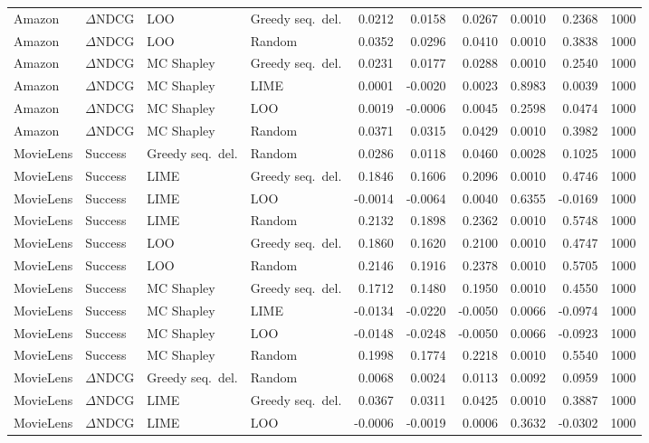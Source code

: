 \begin{longtable}{@{}p{}p{}p{}p{}rrrrrr@{}}
Amazon & $\Delta$NDCG & LOO & Greedy seq.\ del. & 0.0212 & 0.0158 & 0.0267 & 0.0010 & 0.2368 & 1000 \\
Amazon & $\Delta$NDCG & LOO & Random & 0.0352 & 0.0296 & 0.0410 & 0.0010 & 0.3838 & 1000 \\
Amazon & $\Delta$NDCG & MC Shapley & Greedy seq.\ del. & 0.0231 & 0.0177 & 0.0288 & 0.0010 & 0.2540 & 1000 \\
Amazon & $\Delta$NDCG & MC Shapley & LIME & 0.0001 & -0.0020 & 0.0023 & 0.8983 & 0.0039 & 1000 \\
Amazon & $\Delta$NDCG & MC Shapley & LOO & 0.0019 & -0.0006 & 0.0045 & 0.2598 & 0.0474 & 1000 \\
Amazon & $\Delta$NDCG & MC Shapley & Random & 0.0371 & 0.0315 & 0.0429 & 0.0010 & 0.3982 & 1000 \\
MovieLens & Success & Greedy seq.\ del. & Random & 0.0286 & 0.0118 & 0.0460 & 0.0028 & 0.1025 & 1000 \\
MovieLens & Success & LIME & Greedy seq.\ del. & 0.1846 & 0.1606 & 0.2096 & 0.0010 & 0.4746 & 1000 \\
MovieLens & Success & LIME & LOO & -0.0014 & -0.0064 & 0.0040 & 0.6355 & -0.0169 & 1000 \\
MovieLens & Success & LIME & Random & 0.2132 & 0.1898 & 0.2362 & 0.0010 & 0.5748 & 1000 \\
MovieLens & Success & LOO & Greedy seq.\ del. & 0.1860 & 0.1620 & 0.2100 & 0.0010 & 0.4747 & 1000 \\
MovieLens & Success & LOO & Random & 0.2146 & 0.1916 & 0.2378 & 0.0010 & 0.5705 & 1000 \\
MovieLens & Success & MC Shapley & Greedy seq.\ del. & 0.1712 & 0.1480 & 0.1950 & 0.0010 & 0.4550 & 1000 \\
MovieLens & Success & MC Shapley & LIME & -0.0134 & -0.0220 & -0.0050 & 0.0066 & -0.0974 & 1000 \\
MovieLens & Success & MC Shapley & LOO & -0.0148 & -0.0248 & -0.0050 & 0.0066 & -0.0923 & 1000 \\
MovieLens & Success & MC Shapley & Random & 0.1998 & 0.1774 & 0.2218 & 0.0010 & 0.5540 & 1000 \\
MovieLens & $\Delta$NDCG & Greedy seq.\ del. & Random & 0.0068 & 0.0024 & 0.0113 & 0.0092 & 0.0959 & 1000 \\
MovieLens & $\Delta$NDCG & LIME & Greedy seq.\ del. & 0.0367 & 0.0311 & 0.0425 & 0.0010 & 0.3887 & 1000 \\
MovieLens & $\Delta$NDCG & LIME & LOO & -0.0006 & -0.0019 & 0.0006 & 0.3632 & -0.0302 & 1000 \\

\end{longtable}
